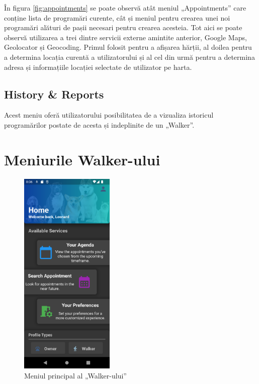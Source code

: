 În figura \ref{fig:appointments} se poate observă atât meniul „Appointments” care conține lista de programări curente, cât și meniul pentru crearea unei noi programări alături de pașii necesari pentru crearea acesteia. Tot aici se poate observă utilizarea a trei dintre servicii externe amintite anterior, Google Maps, Geolocator și Geocoding. Primul folosit pentru a afișarea hărții, al doilea pentru a determina locația curentă a utilizatorului și al cel din urmă pentru a determina adresa și informațiile locației selectate de utilizator pe harta.

\subsection{History \& Reports}

Acest meniu oferă utilizatorului posibilitatea de a vizualiza istoricul programărilor postate de acesta și indeplinite de un „Walker”. 

\section{Meniurile Walker-ului}

\begin{figure}
    \centering
    \includegraphics[width=0.4\textwidth]{images/screenshots/main_menu_walker.png}
    \caption{Meniul principal al „Walker-ului”}
    \label{fig:main_menu_walker}
\end{figure}

